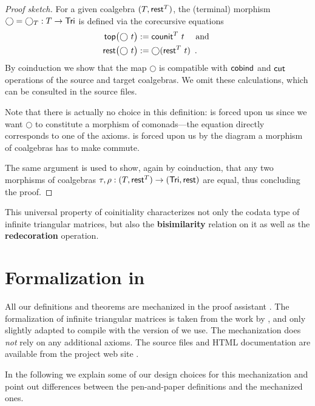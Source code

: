 \documentclass[conference,10pt]{IEEEtran}
\newcommand{\fat}[1]{\textbf{#1}}
\begin{document}
\begin{proof}[Proof sketch]
   For a given coalgebra $(T,\mathsf{rest}^T)$, the (terminal) morphism $\bigcirc = \bigcirc_T:T\to\mathsf{Tri}$ is defined via the corecursive equations
    \begin{align}\head\bigl(\bigcirc~t\bigr) &:= \counit^T~t \quad\text{ and } \label{eq:terminal_top}\\
                     \tail\bigl(\bigcirc~t\bigr) &:= \bigcirc(\tail^T~t) \enspace . \label{eq:terminal_rest}
      \end{align}
      By coinduction we show that the map $\bigcirc$ is compatible with $\mathsf{cobind}$ and $\mathsf{cut}$ operations of the source and 
   target coalgebras. We omit these calculations, which can be consulted in the \coq source files.
   
   Note that there is actually no choice in this definition:  is forced upon us since we want $\bigcirc$ to constitute 
   a morphism of comonads---the equation directly corresponds to one of the axioms.
    is forced upon us by the diagram a morphism of coalgebras has to make commute.
   
   The same argument is used to show, again by coinduction, that any two morphisms of coalgebras $\tau,\rho : (T,\mathsf{rest}^T) \to (\mathsf{Tri},\mathsf{rest})$
   are equal, thus concluding the proof.   
\end{proof}

This universal property of coinitiality characterizes not only the codata type of infinite triangular matrices, but also
the \fat{bisimilarity} relation on it as well as the \fat{redecoration} operation.



\section{Formalization in \coq}\label{sec:formal}

All our definitions and theorems are mechanized in the proof assistant \coq \parencite{coq84pl3}.
The formalization of infinite triangular matrices is taken from the work by \textcite{DBLP:conf/types/MatthesP11},
and only slightly adapted to compile with the version of \coq we use.
The mechanization does \emph{not} rely on any additional axioms.
The \coq source files and HTML documentation are available from the project web site \parencite{trimat_coq}.

In the following we explain some of our design choices for this mechanization
and point out differences between the pen-and-paper definitions and the mechanized ones.
\end{document}

